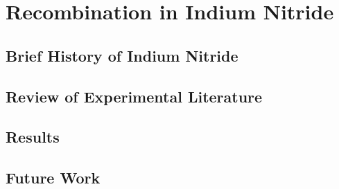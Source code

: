 \section{Recombination in Indium
Nitride}\label{recombination-in-indium-nitride}

\subsection{Brief History of Indium
Nitride}\label{brief-history-of-indium-nitride}

\subsection{Review of Experimental
Literature}\label{review-of-experimental-literature}

\subsection{Results}\label{results}

\subsection{Future Work}\label{future-work}
